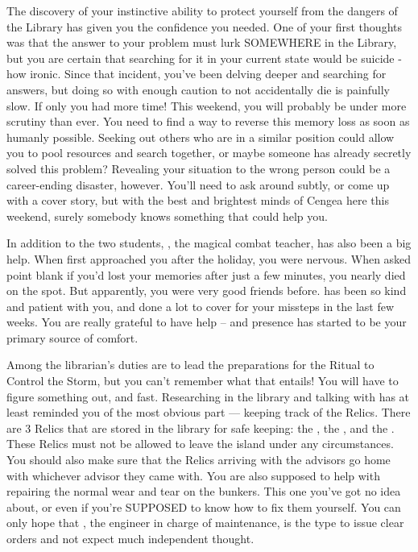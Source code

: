\documentclass[char]{GL2020}
\begin{document}
The discovery of your instinctive ability to protect yourself from the dangers of the Library has given you the confidence you needed. One of your first thoughts was that the answer to your problem must lurk SOMEWHERE in the Library, but you are certain that searching for it in your current state would be suicide - how ironic. Since that incident, you've been delving deeper and searching for answers, but doing so with enough caution to not accidentally die is painfully slow. If only you had more time! This weekend, you will probably be under more scrutiny than ever. You need to find a way to reverse this memory loss as soon as humanly possible. Seeking out others who are in a similar position could allow you to pool resources and search together, or maybe someone has already secretly solved this problem? Revealing your situation to the wrong person could be a career-ending disaster, however. You'll need to ask around subtly, or come up with a cover story, but with the best and brightest minds of Cengea here this weekend, surely somebody knows something that could help you.

In addition to the two students, \cInterpol{\full}, the magical combat teacher, has also been a big help. When \cInterpol{\they} first approached you after the holiday, you were nervous. When \cInterpol{\they} asked point blank if you'd lost your memories after just a few minutes, you nearly died on the spot. But apparently, you were very good friends before. \cInterpol{} has been so kind and patient with you, and done a lot to cover for your missteps in the last few weeks. You are really grateful to have \cInterpol{\their} help -- and \cInterpol{\their} presence has started to be your primary source of comfort. 

Among the librarian's duties are to lead the preparations for the Ritual to Control the Storm, but you can't remember what that entails! You will have to figure something out, and fast. Researching in the library and talking with \cInterpol{} has at least reminded you of the most obvious part — keeping track of the Relics. There are 3 Relics that are stored in the library for safe keeping: the \iNet{}, the \iLariat{}, and the \iScythe{}. These Relics must not be allowed to leave the island under any circumstances. You should also make sure that the Relics arriving with the advisors go home with whichever advisor they came with. You are also supposed to help with repairing the normal wear and tear on the bunkers. This one you've got no idea about, or even if you're SUPPOSED to know how to fix them yourself. You can only hope that \cBunker{\full}, the engineer in charge of maintenance, is the type to issue clear orders and not expect much independent thought.
\end{document}
